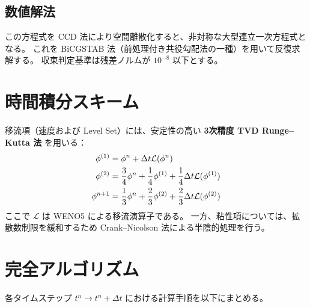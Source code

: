 \documentclass[12pt, a4paper, titlepage, xelatex, ja=standard]{bxjsarticle}
\begin{document}
\subsection{数値解法}

この方程式を CCD 法により空間離散化すると、非対称な大型連立一次方程式となる。
これを BiCGSTAB 法（前処理付き共役勾配法の一種）を用いて反復求解する。
収束判定基準は残差ノルムが $10^{-8}$ 以下とする。


\section{時間積分スキーム}
\label{sec:time}

移流項（速度および Level Set）には、安定性の高い \textbf{3次精度 TVD Runge--Kutta 法} を用いる：
\begin{align}
  \phi^{(1)} &= \phi^n + \Delta t \mathcal{L}(\phi^n) \notag \\
  \phi^{(2)} &= \frac{3}{4}\phi^n + \frac{1}{4}\phi^{(1)} + \frac{1}{4}\Delta t \mathcal{L}(\phi^{(1)}) \notag \\
  \phi^{n+1} &= \frac{1}{3}\phi^n + \frac{2}{3}\phi^{(2)} + \frac{2}{3}\Delta t \mathcal{L}(\phi^{(2)})
\end{align}
ここで $\mathcal{L}$ は WENO5 による移流演算子である。
一方、粘性項については、拡散数制限を緩和するため Crank--Nicolson 法による半陰的処理を行う。


\section{完全アルゴリズム}
\label{sec:algorithm}

各タイムステップ $t^n \to t^n + \Delta t$ における計算手順を以下にまとめる。
\end{document}
